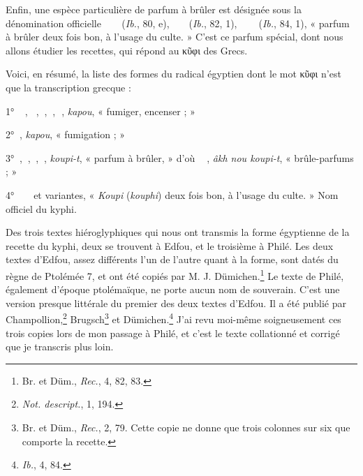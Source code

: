 \documentclass[a4paper, 11pt, oneside]{article}
\newcommand*\hieroAAAA{\raisebox{0.8ex}{}}
\newcommand*\hieroAAAB{}
\newcommand*\hieroAAAD{}
\newcommand*\hieroAAAE{}
\newcommand*\hieroAAAI{}
\newcommand*\hieroAAAK{}
\newcommand*\hieroAAAL{}
\newcommand*\hieroAAAO{}
\newcommand*\hieroAAAR{}
\newcommand*\hieroAACA{}
\newcommand*\hieroAACB{}
\newcommand*\hieroAADH{}
\newcommand*\hieroAAEC{}
\newcommand*\hieroAAED{}
\newcommand*\hieroAAEE{}
\newcommand*\hieroAAEG{}
\newcommand*\hieroAAEH{\raisebox{0.5ex}{}}
\newcommand*\hieroAAEI{}
\newcommand*\hieroAAEJ{}
\newcommand*\hieroAAEK{}
\newcommand*\hieroAAEL{}
\newcommand*\hieroAAEM{}
\newcommand*\hieroAAEN{}
\newcommand*\hieroAAEO{}
\newcommand*\hieroAAEP{\raisebox{0.5ex}{}}
\newcommand*\hieroAAEQ{}
\begin{document}
Enfin, une espèce particulière de parfum à brûler est désignée sous la dénomination officielle $\hieroAAAE\:\hieroAAAR\:\hieroAAEG\:\hieroAAEG\:\hieroAAEH\:\hieroAAAI\:\hieroAAEI$ (\emph{Ib.}, 80, e), $\hieroAAAE\:\hieroAAAR\:\hieroAAEJ\:\hieroAAEG\:\hieroAAED\:\hieroAAAI\:\hieroAAEI$ (\emph{Ib.}, 82, 1), $\hieroAAEK\:\hieroAAEL\:\hieroAAEG\:\hieroAAEG\:\hieroAAEM\:\hieroAAAI\:\hieroAAEN\:\hieroAAEO$ (\emph{Ib.}, 84, 1), « parfum à brûler deux fois bon, à l'usage du culte. » C'est ce parfum spécial, dont nous allons étudier les recettes, qui répond au κῦφι des Grecs.

Voici, en résumé, la liste des formes du radical égyptien dont le mot κῦφι n'est que la transcription grecque :

1° $\hieroAAAA\:\hieroAAAB\:\hieroAAAK\:\hieroAAAL$, $\hieroAAAA\:\hieroAAAB\:\hieroAAAO$, $\hieroAACB\:\hieroAACA$, $\hieroAAAD\:\hieroAACA$, $\hieroAAAD\:\hieroAAEP$, \emph{kapou}, « fumiger, encenser ; »

2° $\hieroAACB\:\hieroAACA$, \emph{kapou}, « fumigation ; »

3° $\hieroAADH\:\hieroAACA$, $\hieroAAEE\:\hieroAAAR$, $\hieroAAAE\:\hieroAAAR$, $\hieroAAAE\:\hieroAAEQ$, \emph{koupi-t}, « parfum à brûler, » d'où $\hieroAAEC\:\hieroAAAR\:\hieroAAED\:\hieroAAEE\:\hieroAAAR$, \emph{âkh nou koupi-t}, « brûle-parfums ; »

4° $\hieroAAAE\:\hieroAAAR\:\hieroAAEG\:\hieroAAEG\:\hieroAAED\:\hieroAAAI\:\hieroAAEI$ et variantes, « \emph{Koupi} (\emph{kouphi}) deux fois bon, à l'usage du culte. » Nom officiel du kyphi.

Des trois textes hiéroglyphiques qui nous ont transmis la forme égyptienne de la recette du kyphi, deux se trouvent à Edfou, et le troisième à Philé. Les deux textes d'Edfou, assez différents l'un de l'autre quant à la forme, sont datés du règne de Ptolémée 7, et ont été copiés par M. J. Dümichen.\footnote{Br. et Düm., \emph{Rec.}, 4, 82, 83.} Le texte de Philé, également d'époque ptolémaïque, ne porte aucun nom de souverain. C'est une version presque littérale du premier des deux textes d'Edfou. Il a été publié par Champollion,\footnote{\emph{Not. descript.}, 1, 194.} Brugsch\footnote{Br. et Düm., \emph{Rec.}, 2, 79. Cette copie ne donne que trois colonnes sur six que comporte la recette.} et Dümichen.\footnote{\emph{Ib.}, 4, 84.} J'ai revu moi-même soigneusement ces trois copies lors de mon passage à Philé, et c'est le texte collationné et corrigé que je transcris plus loin.
\end{document}
